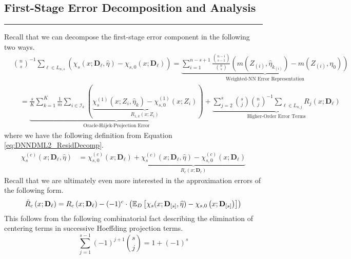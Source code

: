 \subsection{First-Stage Error Decomposition and Analysis}
\hrule

Recall that we can decompose the first-stage error component in the following two ways.
\begin{equation}
    \begin{aligned}
        & \binom{n}{s}^{-1} \sum_{\ell \in L_{n,s}}\left(\chi_{s}\left(x; \mathbf{D}_{\ell}, \hat{\eta}\right) - \chi_{s,0}\left(x; \mathbf{D}_{\ell}\right)\right)
        = \underbrace{\sum_{i = 1}^{n - s + 1} \frac{\binom{n-i}{s-1}}{\binom{n}{s}} \left(m(Z_{(i)}, \hat{\eta}_{k_{(i)}}) - m(Z_{(i)}, \eta_{0})\right)}_{\text{Weighted-NN Error Representation}} \\
        & \quad = \underbrace{\frac{s}{K} \sum_{k = 1}^{K} \frac{1}{m} \sum_{i \in \mathcal{I}_{k}}\left(\underbrace{\chi_{s}^{(1)}\left(x; Z_{i}, \hat{\eta}_{k}\right) - \chi_{s,0}^{(1)}\left(x; Z_{i}\right)}_{R_{1,k}\left(x; Z_{i}\right)}\right)}_{\text{Oracle-H\'ajek-Projection Error}}
         + \underbrace{\sum_{j = 2}^{s} \binom{s}{j} \binom{n}{j}^{-1}\sum_{\ell \in L_{n,j}} R_{j}\left(x; \mathbf{D}_{\ell}\right)}_{\text{Higher-Order Error Terms}}
    \end{aligned}
\end{equation}
where we have the following definition from Equation \ref{eq:DNNDML2_ResidDecomp}.
\begin{equation}
    \begin{aligned}
        \chi_{s}^{(c)}\left(x; \mathbf{D}_{\ell}, \hat{\eta}\right)
        & = \chi_{s,0}^{(c)}\left(x; \mathbf{D}_{\ell}\right) + \underbrace{\chi_{s}^{(c)}\left(x; \mathbf{D}_{\ell}, \hat{\eta}\right) - \chi_{s,0}^{(c)}\left(x; \mathbf{D}_{\ell}\right)}_{R_{c}\left(x; \mathbf{D}_{\ell}\right)}
    \end{aligned}
\end{equation}
Recall that we are ultimately even more interested in the approximation errors of the following form.
\begin{equation}
    \tilde{R}_{c}\left(x; \mathbf{D}_{\ell}\right)
     = R_{c}\left(x; \mathbf{D}_{\ell}\right) - (-1)^{c} \cdot \left(\mathbb{E}_{D}\left[\chi_{s}(x; \mathbf{D}_{[s]}, \widehat{\eta}) - \chi_{s,0}\left(x; \mathbf{D}_{[s]}\right)\right]\right)
\end{equation}
This follows from the following combinatorial fact describing the elimination of centering terms in successive Hoeffding projection terms.
\begin{equation}
    \sum_{j = 1}^{s-1}(-1)^{j+1} \binom{s}{j} = 1 + (-1)^{s}
\end{equation}

